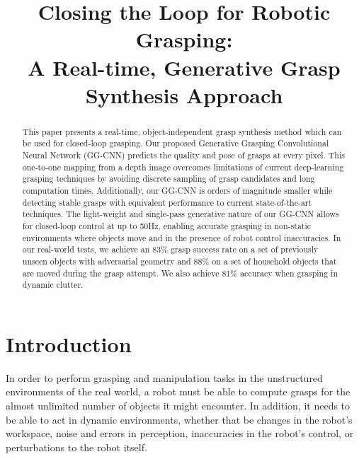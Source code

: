\documentclass[conference]{IEEEtran}
\newcommand{\pack}	{\hspace{-0.08em}}
\newcommand{\A}		{\ensuremath{\rm\pack A}}
\begin{document}
\title{Closing the Loop for Robotic Grasping:\\A Real-time, Generative Grasp Synthesis Approach}



\author{
\vspace{-8mm}
}

\maketitle

\begin{abstract}

This paper presents a real-time, object-independent grasp synthesis method which can be used for closed-loop grasping.
Our proposed Generative Grasping Convolutional Neural Network (GG-CNN) predicts the quality and pose of grasps at every pixel. This one-to-one mapping from a depth image overcomes limitations of current deep-learning grasping techniques by avoiding discrete sampling of grasp candidates and long computation times.
Additionally, our GG-CNN is orders of magnitude smaller while detecting stable grasps with equivalent performance to current state-of-the-art techniques. 
The light-weight and single-pass generative nature of our GG-CNN allows for closed-loop control at up to 50Hz, enabling accurate grasping in non-static environments where objects move and in the presence of robot control inaccuracies.
In our real-world tests, we achieve an 83\% grasp success rate on a set of previously unseen objects with adversarial geometry and 88\% on a set of household objects that are moved during the grasp attempt.
We also achieve 81\% accuracy when grasping in dynamic clutter.

\end{abstract}

\IEEEpeerreviewmaketitle

\section{Introduction}

In order to perform grasping and manipulation tasks in the unstructured environments of the real world, a robot must be able to compute grasps for the almost unlimited number of objects it might encounter. 
In addition, it needs to be able to act in dynamic environments, whether that be changes in the robot's workspace, noise and errors in perception, inaccuracies in the robot's control, or perturbations to the robot itself.
\end{document}
